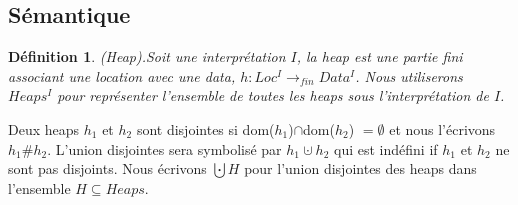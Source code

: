 \documentclass[9pt]{book}
\newtheorem{definition}{D\'efinition}[section]
\begin{document}
	\subsection{S\'emantique}
	\begin{definition}
	(Heap).Soit une interpr\'etation $I$, la heap est une partie fini associant une location avec une data, $h : Loc^{I} \rightarrow_{fin} Data^{I}$. Nous utiliserons $Heaps^{I}$ pour repr\'esenter l'ensemble de toutes les heaps sous l'interpr\'etation de $I$.
	\end{definition}
	Deux heaps $h_{1}$ et $h_{2}$ sont disjointes si dom($h_{1}$)$\cap$dom($h_{2}$) $= \emptyset$ et nous l'\'ecrivons $h_{1}\#h_{2}$. L'union disjointes sera symbolis\'e par $h_{1}\cupdot h_{2}$ qui est ind\'efini if $h_{1}$ et $h_{2}$ ne sont pas disjoints. Nous \'ecrivons $\bigcupdot H$ pour l'union disjointes des heaps dans l'ensemble $H \subseteq Heaps$.
\end{document}
